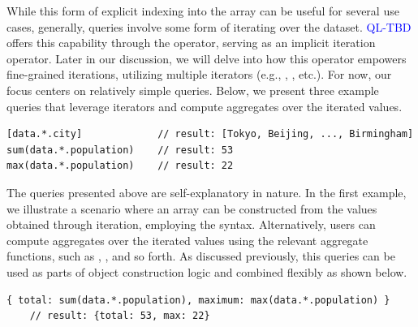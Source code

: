 \documentclass[runningheads]{llncs}
\newcommand{\lang}{\textcolor{blue}{QL-TBD}}
\begin{document}
While this form of explicit indexing into the array can be useful for several
use cases, generally, queries involve some form of iterating over the dataset.
\lang{} offers this capability through the \inline{*} operator,
serving as an implicit iteration operator.
Later in our discussion, we will delve into how this operator empowers fine-grained
iterations, utilizing multiple iterators
(e.g., , , etc.).
For now, our focus centers on relatively simple queries.
Below, we present three example queries that leverage iterators and compute
aggregates over the iterated values.

\begin{lstlisting}[style=JavaScript, columns=flexible]
[data.*.city]             // result: [Tokyo, Beijing, ..., Birmingham]
sum(data.*.population)    // result: 53
max(data.*.population)    // result: 22
\end{lstlisting}

The queries presented above are self-explanatory in nature.
In the first example, we illustrate a scenario where an array can be constructed
from the values obtained through iteration, employing the \inline{[...]} syntax.
Alternatively, users can compute aggregates over the iterated values using the
relevant aggregate functions, such as , , and so forth.
As discussed previously, this queries can be used as parts of object
construction logic and combined flexibly as shown below.

\begin{lstlisting}[style=JavaScript, columns=flexible, numbers=none]
    { total: sum(data.*.population), maximum: max(data.*.population) }
    // result: {total: 53, max: 22}
    \end{lstlisting}


\end{document}
